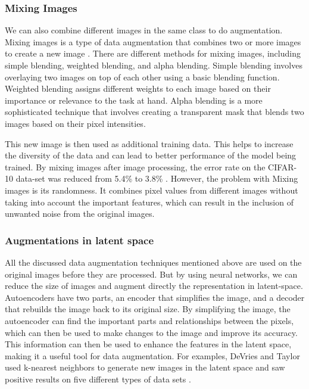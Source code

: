\subsubsection{Mixing Images}
We can also combine different images in the same class to do augmentation. Mixing images is a type of data augmentation that combines two or more images to create a new image \cite{summers2019improved}. There are different methods for mixing images, including simple blending, weighted blending, and alpha blending. Simple blending involves overlaying two images on top of each other using a basic blending function. Weighted blending assigns different weights to each image based on their importance or relevance to the task at hand. Alpha blending is a more sophisticated technique that involves creating a transparent mask that blends two images based on their pixel intensities.

This new image is then used as additional training data. This helps to increase the diversity of the data and can lead to better performance of the model being trained. By mixing images after image processing, the error rate on the CIFAR-10 data-set was reduced from 5.4\% to 3.8\% \cite{liang2018understanding}. However, the problem with Mixing images is its randomness. It combines pixel values from different images without taking into account the important features, which can result in the inclusion of unwanted noise from the original images. 

\subsubsection{Augmentations in latent space}
All the discussed data augmentation techniques mentioned above are used on the original images before they are processed. But by using neural networks, we can reduce the size of images and augment directly the representation in latent-space. Autoencoders have two parts, an encoder that simplifies the image, and a decoder that rebuilds the image back to its original size. By simplifying the image, the autoencoder can find the important parts and relationships between the pixels, which can then be used to make changes to the image and improve its accuracy. This information can then be used to enhance the features in the latent space, making it a useful tool for data augmentation. For examples, DeVries and Taylor used k-nearest neighbors to generate new images in the latent space and saw positive results on five different types of data sets \cite{terrance2017dataset}.

